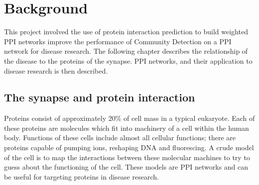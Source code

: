 \chapter{Background}
\label{background}

This project involved the use of protein interaction prediction to build weighted \ac{PPI} networks improve the performance of Community Detection on a \ac{PPI} network for disease research.
The following chapter describes the relationship of the disease to the proteins of the synapse.
\ac{PPI} networks, and their application to disease research is then described.

\section{The synapse and protein interaction}

Proteins consist of approximately 20\% of cell mass in a typical eukaryote\autocite{lodish_molecular_2000}.
Each of these proteins are molecules which fit into machinery of a cell within the human body.%
Functions of these cells include almost all cellular functions; there are proteins capable of pumping ions, reshaping DNA and fluorescing\autocite{alberts_molecular_2008}. %
A crude model of the cell is to map the interactions between these molecular machines to try to guess about the functioning of the cell. %
These models are \ac{PPI} networks and can be useful for targeting proteins in disease research\autocite{chen_identifying_2013}. %

